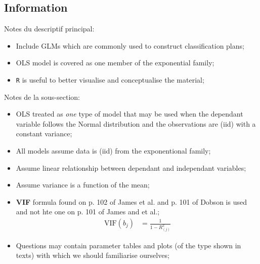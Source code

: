 \documentclass[12pt, titlepage, french]{report}
\begin{document}
\subsection{Information}

\begin{distributions}[Description]
Notes du descriptif principal:
\begin{itemize}
	\item	Include GLMs which are commonly used to construct classification plans;
	\item	OLS model is covered as one member of the exponential family;
	\item	\texttt{R} is useful to better visualise and conceptualise the material;
\end{itemize}
\tcbline
Notes de la sous-section:
\begin{itemize}
	\item	OLS treated as \textit{one} type of model that may be used when the dependant variable follows the Normal distribution and the observations are (iid) with a constant variance;
	\item	All models assume data is (iid) from the exponentional family;
	\item	Assume linear relationship between dependant and independant variables;
	\item	Assume variance is a function of the mean;
	\item	\textbf{VIF} formula found on p. 102 of James et al. and p. 101 of Dobson is used and not hte one on p. 101 of James and et al.;
		\begin{align*}
			\text{VIF}(b_{j})
			&=	\frac{1}{1 - R_{(j)}^{2}}
		\end{align*}
	\item	Questions may contain parameter tables and plots (of the type shown in texts) with which we should familiarise ourselves;
\end{itemize}
\end{distributions}
\end{document}
